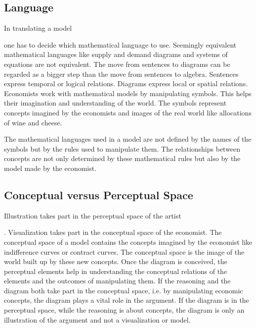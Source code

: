 \documentclass[a4paper, 12pt]{article}
\begin{document}
\subsection*{Language}
In translating a model \begin{comment} Bin mir unsicher, ob da nicht ein Komma hinkommt.\end{comment} one has to decide which mathematical language to use. Seemingly equivalent mathematical languages like supply and demand diagrams and systems of equations are not equivalent. The move from sentences to diagrams can be regarded as a bigger step than the move from sentences to algebra. Sentences express temporal or logical relations. Diagrams express local or spatial relations. 
Economists work with mathematical models by manipulating symbols. This helps their imagination and understanding of the world. The symbols represent concepts imagined by the economists and images of the real world like allocations of wine and cheese. \begin{comment} Warum gerade Wein und Käse :-D Das Beispiel kommt für mich so aus dem Nichts, aber vielleicht ist es für Ökonomen ja DAS Paradebeispiel und ich bin einfach nur eine unwissende Soziologin.\end{comment} The mathematical languages used in a model are not defined by the names of the symbols but by the rules used to manipulate them.
The relationships between concepts are not only determined by these mathematical rules but also by the model made by the economist. %

\subsection*{Conceptual versus Perceptual Space}
Illustration takes part in the perceptual space of the artist \begin{comment} Wenn aus dem Ökonom ein Schöngeist wird.^^ \end{comment}. Visualization takes part in the conceptual space of the economist. The conceptual space of a model contains the concepts imagined by the economist like indifference curves or contract curves. The conceptual space is the image of the world built up by these new concepts. Once the diagram is conceived, the perceptual elements help in understanding the conceptual relations of the elements and the outcomes of manipulating them. If the reasoning and the diagram both take part in the conceptual space, i.e. by manipulating economic concepts, the diagram plays a vital role in the argument. If the diagram is in the perceptual space, while the reasoning is about concepts, the diagram is only an illustration of the argument and not a visualization or model.
\end{document}

